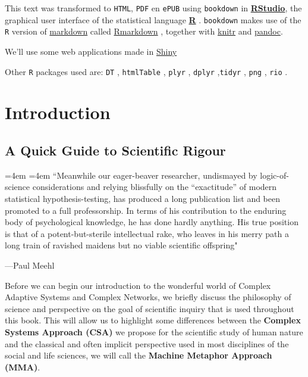\documentclass[12pt,]{book}
\renewenvironment{quote}{%
  \par \small \medskip \block
  \leftskip=4em \rightskip=4em%
  \noindent \ignorespaces}{%
  \par \medskip
  }
\begin{document}
This text was transformed to \texttt{HTML}, \texttt{PDF} en \texttt{ePUB} using \texttt{bookdown}\citep{R-bookdown} in \href{https://www.rstudio.com}{\textbf{RStudio}}, the graphical user interface of the statistical language \href{https://www.r-project.org}{\textbf{R}} \citep{R-base}. \texttt{bookdown} makes use of the \texttt{R} version of \href{https://en.wikipedia.org/wiki/Markdown}{markdown} called \href{http://rmarkdown.rstudio.com}{Rmarkdown} \citep{R-rmarkdown}, together with \href{http://yihui.name/knitr/}{knitr} \citep{R-knitr} and \href{http://pandoc.org}{pandoc}.

We'll use some web applications made in \href{http://shiny.rstudio.com}{Shiny} \citep{R-shiny}

Other \texttt{R} packages used are: \texttt{DT} \citep{R-DT}, \texttt{htmlTable} \citep{R-htmlTable}, \texttt{plyr} \citep{R-plyr}, \texttt{dplyr} \citep{R-dplyr},\texttt{tidyr} \citep{R-tidyr}, \texttt{png} \citep{R-png}, \texttt{rio} \citep{R-rio}.

\hypertarget{part-introduction}{%
\part{Introduction}\label{part-introduction}}

\hypertarget{a-quick-guide-to-scientific-rigour}{%
\chapter{\texorpdfstring{\textbf{A Quick Guide to Scientific Rigour}}{A Quick Guide to Scientific Rigour}}\label{a-quick-guide-to-scientific-rigour}}

\begin{quote}
``Meanwhile our eager-beaver researcher, undismayed by logic-of-science considerations and relying blissfully on the ``exactitude'' of modern statistical hypothesis-testing, has produced a long publication list and been promoted to a full professorship. In terms of his contribution to the enduring body of psychological knowledge, he has done hardly anything. His true position is that of a potent-but-sterile intellectual rake, who leaves in his merry path a long train of ravished maidens but no viable scientific offspring"

---Paul Meehl \citeyearpar[p.~114]{meehl1967a}
\end{quote}

Before we can begin our introduction to the wonderful world of Complex Adaptive Systems and Complex Networks, we briefly discuss the philosophy of science and perspective on the goal of scientific inquiry that is used throughout this book. This will allow us to highlight some differences between the \textbf{Complex Systems Approach (CSA)} we propose for the scientific study of human nature and the classical and often implicit perspective used in most disciplines of the social and life sciences, we will call the \textbf{Machine Metaphor Approach (MMA)}.
\end{document}
